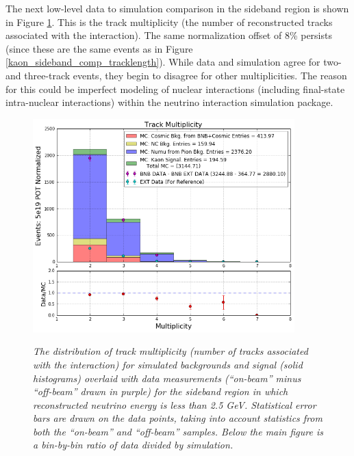 The next low-level data to simulation comparison in the sideband region is shown in Figure \ref{kaon_sideband_comp_multiplicity}. This is the track multiplicity (the number of reconstructed tracks associated with the interaction). The same normalization offset of 8\% persists (since these are the same events as in Figure \ref{kaon_sideband_comp_tracklength}). While data and simulation agree for two- and  three-track events, they begin to disagree for other multiplicities. The reason for this could be imperfect modeling of nuclear interactions (including final-state intra-nuclear interactions) within the neutrino interaction simulation package.\\

\begin{figure}[ht!]
\centering
	\includegraphics[width=0.9\textwidth]{Figures/kaon_sideband_comp_multiplicity.png} \\
\caption{\textit{The distribution of track multiplicity (number of tracks associated with the interaction) for simulated backgrounds and signal (solid histograms) overlaid with data measurements (``on-beam'' minus ``off-beam'' drawn in purple) for the sideband region in which reconstructed neutrino energy is less than 2.5 GeV. Statistical error bars are drawn on the data points, taking into account statistics from both the ``on-beam'' and ``off-beam'' samples. Below the main figure is a bin-by-bin ratio of data divided by simulation.}}\label{kaon_sideband_comp_multiplicity}
\end{figure}


